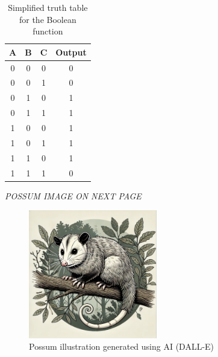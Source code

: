 \begin{table}[H]
    \centering
    \begin{tabular}{|c|c|c|c|}
        \hline
        A & B & C & Output \\
        \hline
        0 & 0 & 0 & 0 \\
        0 & 0 & 1 & 0 \\
        0 & 1 & 0 & 1 \\
        0 & 1 & 1 & 1 \\
        1 & 0 & 0 & 1 \\
        1 & 0 & 1 & 1 \\
        1 & 1 & 0 & 1 \\
        1 & 1 & 1 & 0 \\
        \hline
    \end{tabular}
    \caption{Simplified truth table for the Boolean function}
    \label{tab:simplified_truth_table}
\end{table}

{
\centering
\textit{POSSUM IMAGE ON NEXT PAGE}
}

\begin{figure}
    \centering
    \includegraphics[width=0.5\textwidth]{figures/possum.png}
    \caption{Possum illustration generated using AI (DALL-E)\cite{openai2024possum}}
    \label{fig:possum}
\end{figure}

